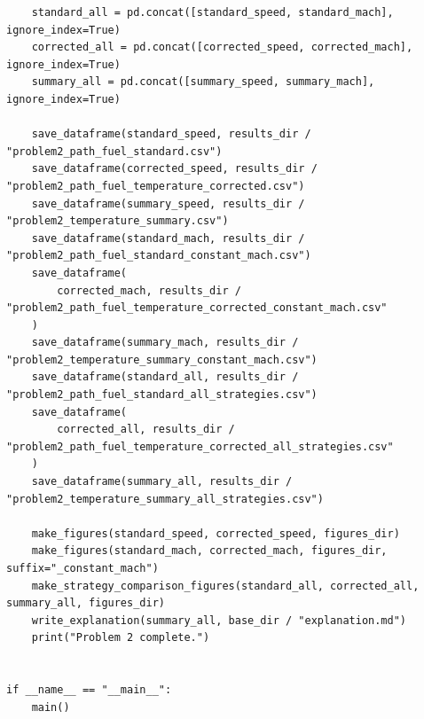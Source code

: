 \documentclass[withoutpreface,bwprint]{cumcmthesis} %
\begin{document}
\begin{center}
\begin{lstlisting}
    standard_all = pd.concat([standard_speed, standard_mach], ignore_index=True)
    corrected_all = pd.concat([corrected_speed, corrected_mach], ignore_index=True)
    summary_all = pd.concat([summary_speed, summary_mach], ignore_index=True)

    save_dataframe(standard_speed, results_dir / "problem2_path_fuel_standard.csv")
    save_dataframe(corrected_speed, results_dir / "problem2_path_fuel_temperature_corrected.csv")
    save_dataframe(summary_speed, results_dir / "problem2_temperature_summary.csv")
    save_dataframe(standard_mach, results_dir / "problem2_path_fuel_standard_constant_mach.csv")
    save_dataframe(
        corrected_mach, results_dir / "problem2_path_fuel_temperature_corrected_constant_mach.csv"
    )
    save_dataframe(summary_mach, results_dir / "problem2_temperature_summary_constant_mach.csv")
    save_dataframe(standard_all, results_dir / "problem2_path_fuel_standard_all_strategies.csv")
    save_dataframe(
        corrected_all, results_dir / "problem2_path_fuel_temperature_corrected_all_strategies.csv"
    )
    save_dataframe(summary_all, results_dir / "problem2_temperature_summary_all_strategies.csv")

    make_figures(standard_speed, corrected_speed, figures_dir)
    make_figures(standard_mach, corrected_mach, figures_dir, suffix="_constant_mach")
    make_strategy_comparison_figures(standard_all, corrected_all, summary_all, figures_dir)
    write_explanation(summary_all, base_dir / "explanation.md")
    print("Problem 2 complete.")


if __name__ == "__main__":
    main()

	
	\end{lstlisting}
\end{center}
\end{document}
